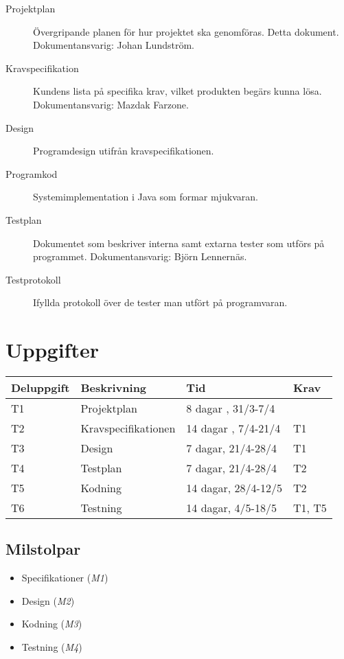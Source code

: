 \documentclass[a4paper]{article}
\begin{document}
\begin{description}
 \item[Projektplan] Övergripande planen för hur projektet ska genomföras. Detta dokument. Dokumentansvarig: Johan Lundström.

 \item[Kravspecifikation] Kundens lista på specifika krav, vilket produkten begärs kunna lösa. Dokumentansvarig: Mazdak Farzone.

 \item[Design] Programdesign utifrån kravspecifikationen.
 
 \item[Programkod] Systemimplementation i Java som formar mjukvaran.

 \item[Testplan] Dokumentet som beskriver interna samt extarna tester som utförs på programmet. Dokumentansvarig: Björn Lennernäs.

 \item[Testprotokoll] Ifyllda protokoll över de tester man utfört på programvaran.
\end{description}

\section{Uppgifter}

\begin{tabular}{l|l|l|l}
\textbf{Deluppgift}		&	\textbf{Beskrivning}		&   \textbf{Tid}		&	\textbf{Krav} \\
\hline
T1 		&	Projektplan		&	8 dagar , 31/3-7/4		&	\\	
T2 		&	Kravspecifikationen		&	14 dagar , 7/4-21/4  	&	T1 \\
T3 		&	Design		&	7 dagar, 21/4-28/4		&	 T1 \\	
T4 		&	Testplan		&	7 dagar, 21/4-28/4		& 	T2 \\	
T5 		&	Kodning	  	&	14 dagar, 28/4-12/5	&	 T2 \\	
T6 		&	Testning		&	14 dagar, 4/5-18/5 	&	 T1, T5 \\	
\end{tabular}

\subsection{Milstolpar} %

\begin{itemize}
  \item Specifikationer (\emph{M1})
  \item Design (\emph{M2})
  \item Kodning (\emph{M3})
  \item Testning (\emph{M4})
\end{itemize}
\end{document}
